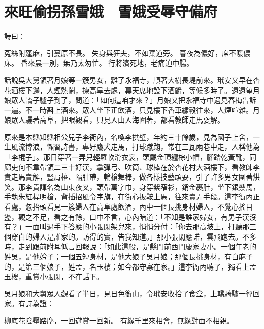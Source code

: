 %

\chapter{來旺偷拐孫雪娥　雪娥受辱守備府}

詩曰：

菟絲附蓬麻，引蔓原不長。
失身與狂夫，不如棄道旁。
暮夜為儂好，席不暖儂床。
昏來晨一別，無乃太匆忙。
行將濱死地，老痛迫中腸。

話說吳大舅領著月娘等一簇男女，離了永福寺，順著大樹長堤前來。玳安又早在杏花酒樓下邊，人煙熱鬧，揀高阜去處，幕天席地設下酒餚，等候多時了。遠遠望月娘眾人轎子驢子到了，問道：「如何這咱才來？」月娘又把永福寺中遇見春梅告訴一遍。不一時斟上酒來。眾人坐下正飲酒，只見樓下香車繡轂往來，人煙喧雜。月娘眾人驪著高阜，把眼觀看，只見人山人海圍著，都看教師走馬耍解。

原來是本縣知縣相公兒子李衙內，名喚李拱璧，年約三十餘歲，見為國子上舍，一生風流博浪，懶習詩書，專好鷹犬走馬，打球蹴踘，常在三瓦兩巷中走，人稱他為 「李棍子」。那日穿著一弄兒輕羅軟滑衣裳，頭戴金頂纏棕小帽，腳踏乾黃靴，同廊吏何不韋帶領二三十好漢，拿彈弓、吹筒、球棒在於杏花村大酒樓下，看教師李貴走馬賣解，豎肩樁、隔肚帶，輪槍舞棒，做各樣技藝頑耍，引了許多男女圍著烘笑。那李貴諢名為山東夜叉，頭帶萬字巾，身穿紫窄衫，銷金裹肚，坐下銀鬃馬，手執朱紅桿明槍，背插招風令字旗，在街心扳鞍上馬，往來賣弄手段。這李衙內正看處，忽抬頭看見一簇婦人在高阜處飲酒，內中一個長挑身材婦人，不覺心搖目盪，觀之不足，看之有餘，口中不言，心內暗道：「不知是誰家婦女，有男子漢沒有？」一面叫過手下答應的小張閑架兒來，悄悄分付：「你去那高坡上，打聽那三個穿白的婦人是誰家的。訪得的實，告我知道。」那小張閑應諾，雲飛跑去。不多時，走到跟前附耳低言回報說：「如此這般，是縣門前西門慶家妻小。一個年老的姓吳，是他妗子；一個五短身材，是他大娘子吳月娘；那個長挑身材，有白麻子的，是第三個娘子，姓孟，名玉樓；如今都守寡在家。」這李衙內聽了，獨看上孟玉樓，重賞小張閑，不在話下。

吳月娘和大舅眾人觀看了半日，見日色銜山，令玳安收拾了食盒，上轎騎驢一徑回家。有詩為證：

柳底花陰壓路塵，一回遊賞一回新。
有緣千里來相會，無緣對面不相親。


